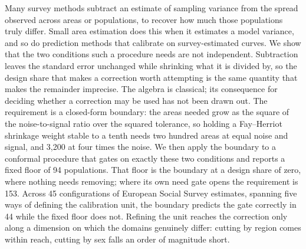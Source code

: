 Many survey methods subtract an estimate of sampling variance from the spread
observed across areas or populations, to recover how much those populations
truly differ. Small area estimation does this when it estimates a model
variance, and so do prediction methods that calibrate on survey-estimated
curves. We show that the two conditions such a procedure needs are not
independent. Subtraction leaves the standard error unchanged while shrinking
what it is divided by, so the design share that makes a correction worth
attempting is the same quantity that makes the remainder imprecise. The algebra
is classical; its consequence for deciding whether a correction may be used has
not been drawn out. The requirement is a closed-form boundary: the areas needed
grow as the square of the noise-to-signal ratio over the squared tolerance, so
holding a Fay--Herriot shrinkage weight stable to a tenth needs two hundred
areas at equal noise and signal, and 3,200 at four times the noise. We then
apply the boundary to a conformal procedure that gates on exactly these two
conditions and reports a fixed floor of 94 populations. That floor is the
boundary at a design share of zero, where nothing needs removing; where its own
need gate opens the requirement is 153. Across 45 configurations of European
Social Survey estimates, spanning five ways of defining the calibration unit,
the boundary predicts the gate correctly in 44 while the fixed floor does not.
Refining the unit reaches the correction only along a dimension on which the
domains genuinely differ: cutting by region comes within reach, cutting by sex
falls an order of magnitude short.
